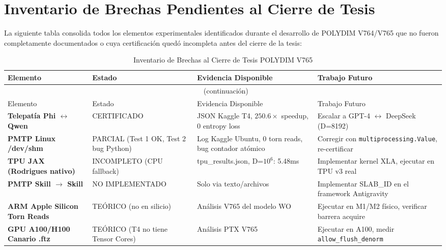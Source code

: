 \section{Inventario de Brechas Pendientes al Cierre de Tesis}

La siguiente tabla consolida todos los elementos experimentales identificados durante
el desarrollo de POLYDIM V764/V765 que no fueron completamente documentados o
cuya certificación quedó incompleta antes del cierre de la tesis:

\begin{longtable}{@{}p{4cm}p{3cm}p{3.5cm}p{4cm}@{}}
\caption{Inventario de Brechas al Cierre de Tesis POLYDIM V765}
\label{tab:brechas_tesis} \\
\toprule
Elemento & Estado & Evidencia Disponible & Trabajo Futuro \\
\midrule
\endfirsthead
\multicolumn{4}{c}{\tablename\ \thetable{} (continuación)} \\
\toprule
Elemento & Estado & Evidencia Disponible & Trabajo Futuro \\
\midrule
\endhead
\bottomrule
\endfoot

\textbf{Telepatía Phi $\leftrightarrow$ Qwen} &
CERTIFICADO & JSON Kaggle T4, $250.6\times$ speedup, 0 entropy loss &
Escalar a GPT-4 $\leftrightarrow$ DeepSeek (D=8192) \\

\textbf{PMTP Linux /dev/shm} &
PARCIAL (Test 1 OK, Test 2 bug Python) &
Log Kaggle Ubuntu, 0 torn reads, bug contador atómico &
Corregir con \texttt{multiprocessing.Value}, re-certificar \\

\textbf{TPU JAX (Rodrigues nativo)} &
INCOMPLETO (CPU fallback) &
tpu\_results.json, D=$10^6$: 5.48ms & Implementar kernel XLA, ejecutar en TPU v3 real \\

\textbf{PMTP Skill $\to$ Skill} &
NO IMPLEMENTADO &
Solo via texto/archivos &
Implementar SLAB\_ID en el framework Antigravity \\

\textbf{ARM Apple Silicon Torn Reads} &
TEÓRICO (no en silicio) &
Análisis V765 del modelo WO &
Ejecutar en M1/M2 físico, verificar barrera acquire \\

\textbf{GPU A100/H100 Canario .ftz} &
TEÓRICO (T4 no tiene Tensor Cores) &
Análisis PTX V765 &
Ejecutar en A100, medir \texttt{allow\_flush\_denorm} \\


\end{longtable}
